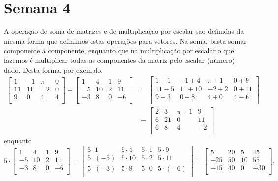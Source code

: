 \documentclass[../livro.tex]{subfiles}  %
\begin{document}
\chapter{Semana 4}


A operação de soma de matrizes e de multiplicação por escalar são definidas da mesma forma que definimos estas operações para vetores. Na soma, basta somar componente a componente, enquanto que na multiplicação por escalar o que fazemos é multiplicar todas as componentes da matriz pelo escalar (número) dado. Desta forma, por exemplo,
\begin{align*}
\left[
\begin{array}{cccc}
1 & -1 & \pi & 0 \\
11 & 11 & -2 & 0 \\
9 & 0 & 4 & 4 \\
\end{array}
\right] +
\left[
\begin{array}{cccc}
1 & 4 & 1 & 9 \\
-5 & 10 & 2 & 11 \\
-3 & 8 & 0 & -6 \\
\end{array}
\right] & =
\left[
\begin{array}{cccc}
1+1 & -1 +4 & \pi + 1 & 0+ 9 \\
11-5 & 11+10 & -2+2 & 0+11 \\
9-3 & 0+8 & 4+0 & 4-6 \\
\end{array}
\right] \\
& =
\left[
\begin{array}{cccc}
2 & 3 & \pi + 1 & 9 \\
6 & 21 & 0 & 11 \\
6 & 8 & 4 & -2 \\
\end{array}
\right]
\end{align*}
enquanto
\[
5\cdot \left[
\begin{array}{cccc}
1 & 4 & 1 & 9 \\
-5 & 10 & 2 & 11 \\
-3 & 8 & 0 & -6 \\
\end{array}
\right] =
\left[
\begin{array}{cccc}
5\cdot 1 & 5\cdot 4 & 5\cdot 1 & 5\cdot 9 \\
5\cdot (-5) & 5\cdot 10 & 5\cdot 2 & 5\cdot 11 \\
5\cdot (-3) & 5\cdot 8 & 5\cdot 0 & 5\cdot (-6) \\
\end{array}
\right] =
\left[
\begin{array}{cccc}
5 & 20 & 5 & 45 \\
-25 & 50 & 10 & 55 \\
-15 & 40 & 0 & -30 \\
\end{array}
\right].
\]
\end{document}
